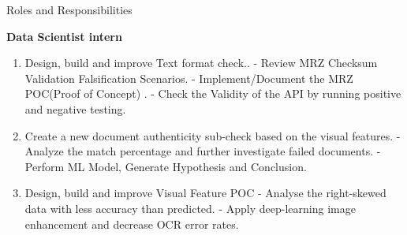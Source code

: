\documentclass[aspectratio=169,xcolor=dvipsnames]{beamer}
\begin{document}

\begin{frame}{Roles and Responsibilities }
    \tableofcontents

    \textbf{Data Scientist intern}
    \begin{enumerate}
        \item Design, build and improve Text format check..\break 
            - Review MRZ Checksum Validation Falsification Scenarios.\break 
            - Implement/Document the MRZ POC(Proof of Concept)  .\break
            - Check the Validity of the API by running positive and negative testing. \break
            
         \item  Create a new document authenticity sub-check based on the visual features.\break 
            - Analyze the match percentage and further investigate failed documents.\break 
            - Perform ML Model, Generate Hypothesis and Conclusion.\break
            
        \item Design, build and improve Visual Feature POC\break 
            - Analyse the right-skewed data with less accuracy than predicted.\break 
            - Apply deep-learning image enhancement and decrease OCR error rates.\break
        \end{enumerate}
\end{frame}



\end{document}
